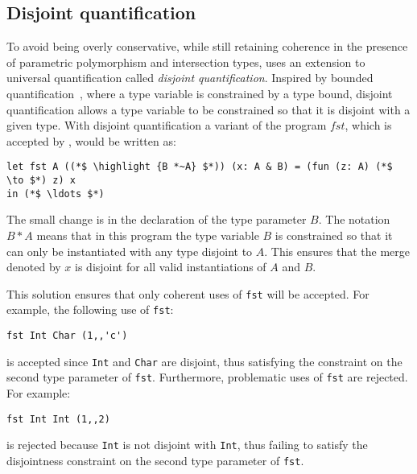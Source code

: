\begin{comment}
\subsection{A more liberal attempt}

Since the resulting calculus is not satisfactory, we ought to find a more liberal solution,
which enables the combination of type variables and intersection types. 
A possible approach would be to assign constraints to each type variable, an delay the 
check for disjointness until type application/instantiation. 
\end{comment}

\subsection{Disjoint quantification}

To avoid being overly conservative, while still retaining coherence in the
presence of parametric polymorphism and intersection types, \name uses
an extension to universal quantification called \emph{disjoint quantification}.
Inspired by bounded quantification~\cite{Cardelli:1994},
where a type variable is constrained by a type bound, disjoint quantification 
allows a type variable to be constrained so that it is disjoint with a given type. 
With disjoint quantification a variant of the program $fst$, which
is accepted by \name, would be written as:
\begin{lstlisting}
let fst A ((*$ \highlight {B *~A} $*)) (x: A & B) = (fun (z: A) (*$ \to $*) z) x
in (*$ \ldots $*)
\end{lstlisting}
The small change is in the declaration of the type parameter $B$. The notation
$B*A$ means that in this program the type variable $B$ is constrained so that
it can only be instantiated with any type disjoint to $A$.
This ensures that the
merge denoted by $x$ is disjoint for all valid instantiations of $A$ and $B$.

This solution ensures that only coherent uses of \lstinline$fst$ will be accepted.
For example, the following use of \lstinline$fst$:
\begin{lstlisting}
fst Int Char (1,,'c')
\end{lstlisting}
is accepted since \lstinline$Int$ and \lstinline$Char$ are disjoint, thus satisfying the constraint
on the second type parameter of \lstinline$fst$.
Furthermore, problematic uses of \lstinline$fst$ are rejected. For example:
\begin{lstlisting}
fst Int Int (1,,2)
\end{lstlisting}
is rejected because \lstinline$Int$ is not disjoint with \lstinline$Int$, thus failing to satisfy the
disjointness constraint on the second type parameter of \lstinline$fst$.

